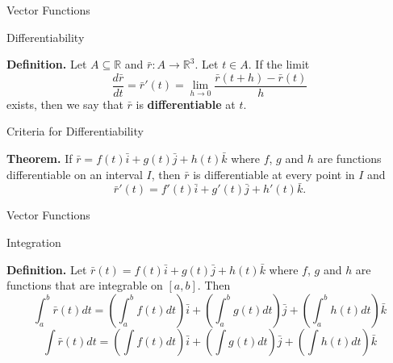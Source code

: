 \documentclass{beamer}
\begin{document}
    \begin{frame}[t]{Vector Functions}
        \begin{block}{Differentiability}
            \par \textbf{Definition.} Let $A \subseteq \mathbb{R}$ and $\bar{r}: A \to \mathbb{R}^3$. Let $t \in A$. If the limit
            \begin{equation*}
                \dfrac{d \bar{r}}{dt} = \bar{r}'(t) = \lim\limits_{h \to 0} \dfrac{\bar{r}(t+h) - \bar{r}(t)}{h}
            \end{equation*}
            exists, then we say that $\bar{r}$ is \textbf{differentiable} at $t$.
        \end{block}

        \begin{block}{Criteria for Differentiability}
            \par \textbf{Theorem.} If $\bar{r} = f(t) \bar{i} + g(t) \bar{j} + h(t) \bar{k}$ where $f$, $g$ and $h$ are functions differentiable on an interval $I$, then $\bar{r}$ is differentiable at every point in $I$ and 
            \begin{equation*}
                \bar{r}'(t) = f'(t) \bar{i} + g'(t) \bar{j} + h'(t) \bar{k} .
            \end{equation*}
        \end{block}
    \end{frame}

    \begin{frame}[t]{Vector Functions}
        \begin{block}{Integration}
            \par \textbf{Definition.} Let $\bar{r}(t) = f(t) \bar{i} + g(t) \bar{j} + h(t) \bar{k}$ where $f$, $g$ and $h$ are functions that are integrable on $[a,b]$. Then
            \begin{equation*}
                \int_{a}^{b} \bar{r}(t) d t=\left(\int_{a}^{b} f(t) d t\right) \bar{i}+\left(\int_{a}^{b} g(t) d t\right) \bar{j}+\left(\int_{a}^{b} h(t) d t\right) \bar{k}
            \end{equation*}
            \begin{equation*}
                \int \bar{r}(t) d t=\left(\int f(t) d t\right) \bar{i}+\left(\int g(t) d t\right) \bar{j}+\left(\int h(t) d t\right) \bar{k}
            \end{equation*}
        \end{block}
    \end{frame}
\end{document}
